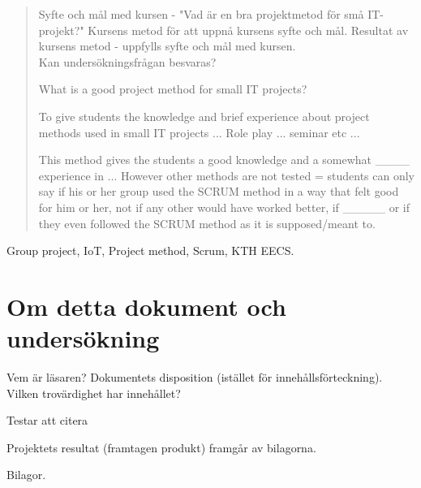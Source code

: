 
\begin{abstract}
Syfte och mål med kursen - "Vad är en bra projektmetod för små IT-projekt?" Kursens metod för att uppnå
kursens syfte och mål. Resultat av kursens metod - uppfylls syfte och mål med kursen.\\
Kan undersökningsfrågan besvaras?

What is a good project method for small IT projects? 

To give students the knowledge and brief experience about project methods used in small IT projects ... Role play ... seminar etc ...

This method gives the students a good knowledge and a somewhat ____ experience in ... However other methods are not tested = students can only say if his or her group used the SCRUM method in a way that felt good for him or her, not if any other would have worked better, if _____ or if they even followed the SCRUM method as it is supposed/meant to. 


\end{abstract}

\begin{IEEEkeywords}
Group project, IoT, Project method, Scrum, KTH EECS. 
\end{IEEEkeywords}

\section{Om detta dokument och undersökning}
Vem är läsaren? Dokumentets disposition (istället för innehållsförteckning). Vilken trovärdighet har innehållet?

Testar att citera \cite{eklund_arbeta_2010}

Projektets resultat (framtagen produkt) framgår av bilagorna.

Bilagor.

